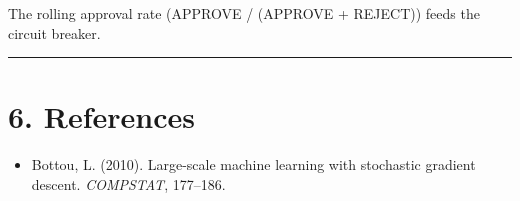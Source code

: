 The rolling approval rate (APPROVE / (APPROVE + REJECT)) feeds the circuit breaker.

\medskip\noindent\rule{\linewidth}{0.4pt}\medskip

\section*{6. References}

\begin{itemize}
  \item [bottou2010large] Bottou, L. (2010). Large-scale machine learning with stochastic gradient descent. \textit{COMPSTAT}, 177--186.
\end{itemize}
